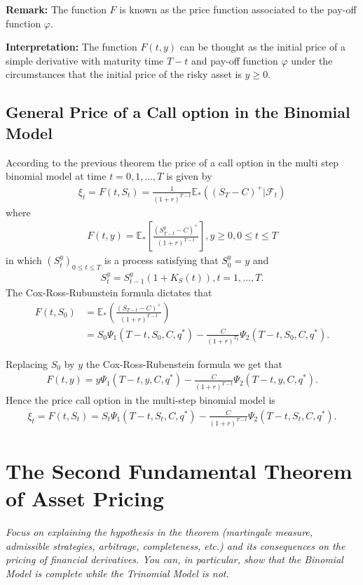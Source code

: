 \documentclass{article}
\theoremstyle{definition}
\numberwithin{equation}{section}
\begin{document}
\textbf{Remark: } The function $F$ is known as the price function associated to the pay-off function $\varphi$. 

\textbf{Interpretation: } The function $F(t,y)$ can be thought as the initial price of a simple derivative with maturity time $T-t$ and pay-off function $\varphi$ under the circumstances that the initial price of the risky asset is $y \geq 0$. 

\subsection{General Price of a Call option in the Binomial Model}
According to the previous theorem the price of a call option in the multi step binomial model at time $t = 0,1, \ldots, T$ is given by 
\begin{align}
    \xi_t = F(t, S_t) = \frac{1}{(1+r)^{T-t}} \mathbb{E}_* \left( (S_T - C)^+ | \mathscr{F}_t \right)
\end{align}
where 
\begin{align}
    F(t,y) = \mathbb{E}_* \left[ \frac{(S_{T-t}^y - C)^+}{(1+r)^{T-t}} \right], y \geq 0, 0 \leq t \leq T
\end{align}
in which $(S_t^y)_{0 \leq t \leq T}$ is a process satisfying that $S_0^y = y$ and 
\begin{align}
    S_t^y = S_{t-1}^y(1 + K_S(t)), t = 1, \ldots, T. 
\end{align}
The Cox-Ross-Rubunstein formula dictates that 
\begin{align}
    F(t, S_0) &= \mathbb{E}_* \left(  \frac{(S_{T-t} - C)^+}{(1+r)^{T-t}} \right)\\
    &= S_0 \Psi_1 (T-t, S_0, C, q^*) - \frac{C}{(1+r)^{T_0}} \Psi_2(T-t, S_0, C, q^*).
\end{align}

Replacing $S_0$ by $y$ the Cox-Ross-Rubenstein formula we get that 
\begin{align}
    F(t, y) = y \Psi_1 (T-t, y, C, q^*) - \frac{C}{(1+r)^{T-t}}\Psi_2(T-t, y, C, q^*). 
\end{align}
Hence the price call option in the multi-step binomial model is 
\begin{align}
    \xi_t = F(t, S_t) = S_t \Psi_1(T-t, S_t,C, q^*) - \frac{C}{(1+r)^{T-t}} \Psi_2(T-t, S_t, C, q^*).
\end{align}

\newpage

\section{The Second Fundamental Theorem of Asset Pricing}
\textit{Focus on explaining the hypothesis in the theorem (martingale measure, admissible strategies, arbitrage, completeness, etc.) and its consequences on the pricing of financial derivatives. You can, in particular, show that the Binomial Model is complete while the Trinomial Model is not.}
\end{document}
